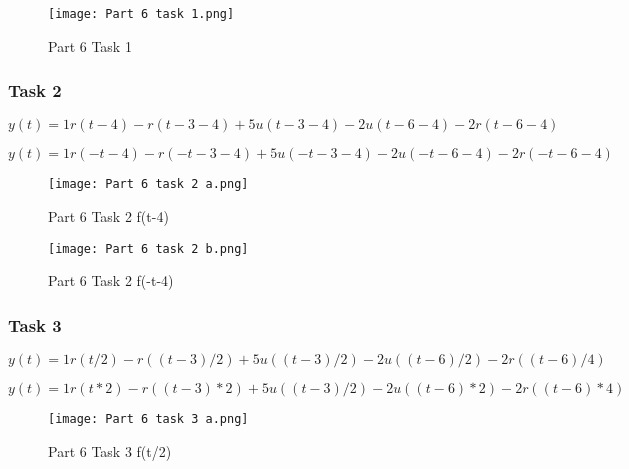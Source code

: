 \documentclass[11pt,a4]{report}
\begin{document}
\begin{figure}[h!]
    \begin{center}
  \caption{Part 6 Task 1}
  \texttt{[image: Part 6 task 1.png]}
\end{center}
\end{figure}

\subsubsection{Task 2}


\begin{equation}
    y(t) = 1r(t-4) -r(t-3-4) + 5u(t-3-4)-2u(t-6-4) - 2r(t-6-4)
\end{equation}

\begin{equation}
    y(t) = 1r(-t-4) -r(-t-3-4) + 5u(-t-3-4)-2u(-t-6-4) - 2r(-t-6-4)
\end{equation}

\begin{figure}[h!]
    \begin{center}
  \caption{Part 6 Task 2 f(t-4)}
  \texttt{[image: Part 6 task 2 a.png]}
\end{center}
\end{figure}
\newpage
\begin{figure}[h!]
    \begin{center}
  \caption{Part 6 Task 2 f(-t-4)}
  \texttt{[image: Part 6 task 2 b.png]}
\end{center}
\end{figure}

\subsubsection{Task 3}

\begin{equation}
    y(t) = 1r(t/2) -r((t-3)/2) + 5u((t-3)/2)-2u((t-6)/2) - 2r((t-6)/4)
\end{equation}

\begin{equation}
    y(t) = 1r(t*2) -r((t-3)*2) + 5u((t-3)/2)-2u((t-6)*2) - 2r((t-6)*4)
\end{equation}

\begin{figure}[h!]
    \begin{center}
  \caption{Part 6 Task 3 f(t/2)}
  \texttt{[image: Part 6 task 3 a.png]}
\end{center}
\end{figure}
\end{document}
